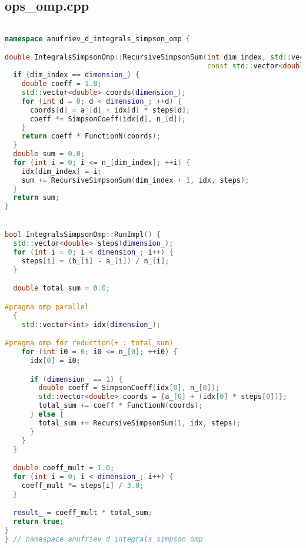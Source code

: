\documentclass[a4paper,12pt]{article}
\begin{document}
\subsection{ops\_omp.cpp}
\begin{lstlisting}[language=C++, caption=Функция RunImpl из ops\_omp.cpp, basicstyle=\ttfamily\tiny]

namespace anufriev_d_integrals_simpson_omp {

double IntegralsSimpsonOmp::RecursiveSimpsonSum(int dim_index, std::vector<int>& idx,
                                                const std::vector<double>& steps) const {
  if (dim_index == dimension_) {
    double coeff = 1.0;
    std::vector<double> coords(dimension_);
    for (int d = 0; d < dimension_; ++d) {
      coords[d] = a_[d] + idx[d] * steps[d];
      coeff *= SimpsonCoeff(idx[d], n_[d]);
    }
    return coeff * FunctionN(coords);
  }
  double sum = 0.0;
  for (int i = 0; i <= n_[dim_index]; ++i) {
    idx[dim_index] = i;
    sum += RecursiveSimpsonSum(dim_index + 1, idx, steps);
  }
  return sum;
}


bool IntegralsSimpsonOmp::RunImpl() {
  std::vector<double> steps(dimension_);
  for (int i = 0; i < dimension_; i++) {
    steps[i] = (b_[i] - a_[i]) / n_[i];
  }

  double total_sum = 0.0;

#pragma omp parallel
  {
    std::vector<int> idx(dimension_);

#pragma omp for reduction(+ : total_sum)
    for (int i0 = 0; i0 <= n_[0]; ++i0) {
      idx[0] = i0;

      if (dimension_ == 1) {
        double coeff = SimpsonCoeff(idx[0], n_[0]);
        std::vector<double> coords = {a_[0] + (idx[0] * steps[0])};
        total_sum += coeff * FunctionN(coords);
      } else {
        total_sum += RecursiveSimpsonSum(1, idx, steps);
      }
    }
  }

  double coeff_mult = 1.0;
  for (int i = 0; i < dimension_; i++) {
    coeff_mult *= steps[i] / 3.0;
  }

  result_ = coeff_mult * total_sum;
  return true;
}
} // namespace anufriev_d_integrals_simpson_omp
\end{lstlisting}

\newpage
\end{document}
